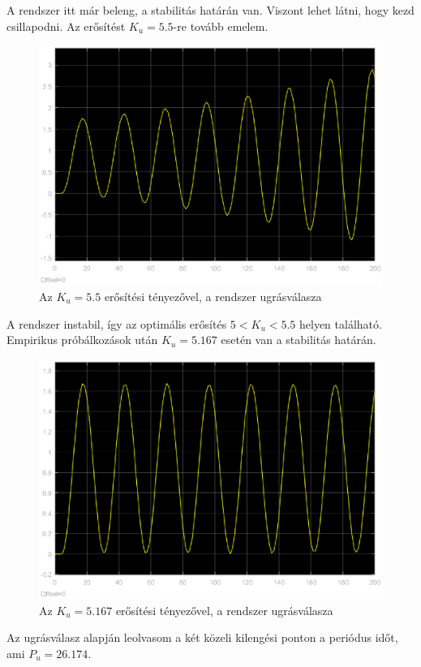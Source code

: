 \documentclass[12pt]{article}
\begin{document}
A rendszer itt már beleng, a stabilitás határán van. Viszont lehet látni, hogy kezd csillapodni. Az erősítést $K_u=5.5$-re tovább emelem.
\begin{figure}[H]
\centering
\includegraphics[scale=.70]{ZNSKU55}
\caption{Az $K_u=5.5$ erősítési tényezővel, a rendszer ugrásválasza}
\end{figure}
A rendszer instabil, így az optimális erősítés $5<K_u<5.5$ helyen található. Empirikus próbálkozások után $K_u=5.167$ esetén van a stabilitás határán.
\begin{figure}[H]
\centering
\includegraphics[scale=.70]{ZNSKU5167}
\caption{Az $K_u=5.167$ erősítési tényezővel, a rendszer ugrásválasza}
\end{figure}
Az ugrásválasz alapján leolvasom a két közeli kilengési ponton a periódus időt, ami $P_u=26.174$.
\end{document}
